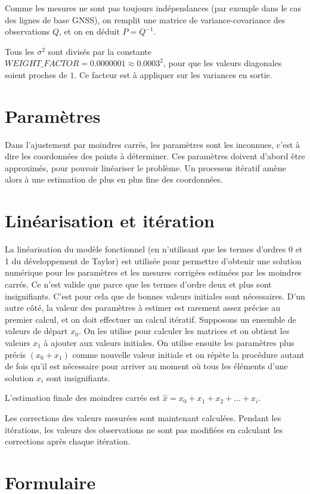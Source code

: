 \documentclass[french]{report}
\begin{document}
Comme les mesures ne sont pas toujours indépendances (par exemple dans le cas des lignes de base GNSS), on remplit une matrice de variance-covariance des observations $Q$, et on en déduit $P=Q^{-1}$.

Tous les $\sigma^2$ sont divisés par la constante $WEIGHT\_FACTOR = 0.0000001 \approx 0.0003^2$, pour que les valeurs diagonales soient proches de $1$.
Ce facteur est à appliquer sur les variances en sortie.

\section{Paramètres}
Dans l'ajustement par moindres carrés, les paramètres sont les inconnues, c'est à dire les coordonnées des points à déterminer. Ces paramètres doivent d'abord être approximés, pour pouvoir linéariser le problème. Un processus itératif amène alors à une estimation de plus en plus fine des coordonnées.


\section{Linéarisation et itération}
La linéarisation du modèle fonctionnel (en n'utilisant que les termes d'ordres 0 et 1 du développement de Taylor) est utilisée pour permettre d'obtenir
une solution numérique pour les paramètres et les mesures corrigées estimées par les moindres carrés.
Ce n'est valide que parce que les termes d'ordre deux et plus sont insignifiants. C'est pour cela que de bonnes valeurs initiales sont nécessaires.
D'un autre côté, la valeur des paramètres à estimer est rarement assez précise au premier calcul, et on doit effectuer un calcul itératif.
Supposons un ensemble de valeurs de départ $x_0$. On les utilise pour calculer les matrices et on obtient les valeurs $x_1$ à ajouter aux valeurs initiales.
On utilise ensuite les paramètres plus précis $(x_0 + x_1)$ comme nouvelle valeur initiale et on répète la procédure autant de fois qu'il est nécessaire pour arriver au moment où tous les éléments d'une solution $x_i$ sont insignifiants.

L'estimation finale des moindres carrés est $\hat{x}=x_0 + x_1 + x_2 + \dots + x_i$.

Les corrections des valeurs mesurées sont maintenant calculées.
Pendant les itérations, les valeurs des observations ne sont pas modifiées en calculant les corrections après chaque itération.


\section{Formulaire}
\end{document}
